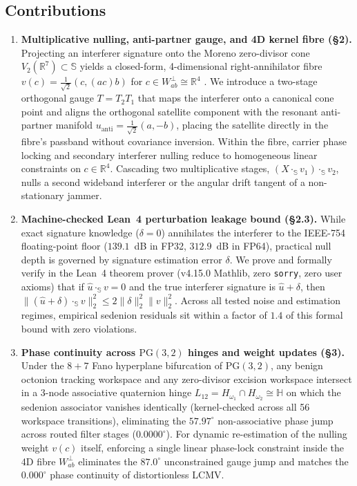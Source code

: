 \subsection*{Contributions}

\begin{enumerate}
\item \textbf{Multiplicative nulling, anti-partner gauge, and 4D kernel fibre (\S2).}
Projecting an interferer signature onto the Moreno zero-divisor cone
$V_2(\mathbb{R}^7)\subset\mathbb{S}$ yields a closed-form, 4-dimensional right-annihilator
fibre $v(c)=\frac{1}{\sqrt{2}}(c,(ac)b)$ for $c\in W_{ab}^\perp\cong\mathbb{R}^4$
\cite{moreno1998,agourakis2026pg32}. We introduce a two-stage orthogonal gauge $T=T_2T_1$ that
maps the interferer onto a canonical cone point and aligns the orthogonal satellite component
with the resonant anti-partner manifold $u_{\mathrm{anti}}=\frac{1}{\sqrt{2}}(a,-b)$, placing
the satellite directly in the fibre's passband without covariance inversion. Within the fibre,
carrier phase locking and secondary interferer nulling reduce to homogeneous linear
constraints on $c\in\mathbb{R}^4$.
Cascading two multiplicative stages, $(X\cdot_{\mathbb{S}} v_1)\cdot_{\mathbb{S}} v_2$, nulls
a second wideband interferer or the angular drift tangent of a non-stationary jammer.

\item \textbf{Machine-checked Lean~4 perturbation leakage bound (\S2.3).}
While exact signature knowledge ($\delta=0$) annihilates the interferer to the IEEE-754
floating-point floor ($139.1$~dB in FP32, $312.9$~dB in FP64), practical null depth is
governed by signature estimation error $\delta$. We prove and formally verify in the Lean~4
theorem prover (v4.15.0 Mathlib, zero \texttt{sorry}, zero user axioms) that if
$\hat u\cdot_{\mathbb{S}} v=0$ and the true interferer signature is $\hat u+\delta$, then
$\|(\hat u+\delta)\cdot_{\mathbb{S}} v\|_2^2 \le 2\|\delta\|_2^2\|v\|_2^2$. Across all tested
noise and estimation regimes, empirical sedenion residuals sit within a factor of $1.4$ of
this formal bound with zero violations.

\item \textbf{Phase continuity across $\mathrm{PG}(3,2)$ hinges and weight updates (\S3).}
Under the $8+7$ Fano hyperplane bifurcation of $\mathrm{PG}(3,2)$, any benign octonion tracking
workspace and any zero-divisor excision workspace intersect in a 3-node associative quaternion
hinge $L_{12}=H_{\omega_1}\cap H_{\omega_2}\cong\mathbb{H}$ on which the sedenion associator
vanishes identically (kernel-checked across all 56 workspace transitions), eliminating the
$57.97^\circ$ non-associative phase jump across routed filter stages ($0.0000^\circ$). For
dynamic re-estimation of the nulling weight $v(c)$ itself, enforcing a single linear
phase-lock constraint inside the 4D fibre $W_{ab}^\perp$ eliminates the $87.0^\circ$
unconstrained gauge jump and matches the $0.000^\circ$ phase continuity of distortionless LCMV.


\end{enumerate}
